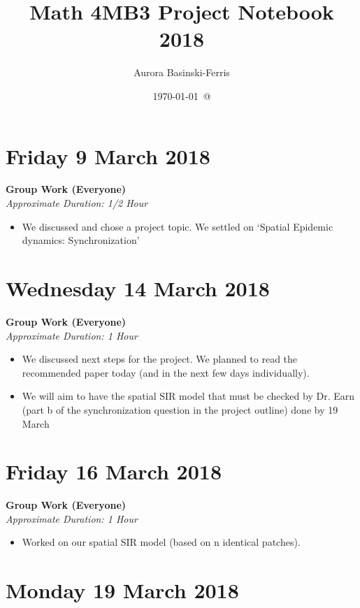 \documentclass[12pt]{article}\usepackage[]{graphicx}\usepackage[]{color}
\title{Math 4MB3 Project Notebook 2018}
\author{Aurora Basinski-Ferris}
\date{\today\ @ \thistime}
\begin{document}
\maketitle

\section*{Friday 9 March 2018}

\textbf{Group Work (Everyone)} \\
\emph{Approximate Duration: 1/2 Hour}

\begin{itemize}
\item We discussed and chose a project topic. We settled on `Spatial Epidemic dynamics: Synchronization'
\end{itemize}

\section*{Wednesday 14 March 2018}

\textbf{Group Work (Everyone)} \\
\emph{Approximate Duration: 1 Hour}

\begin{itemize}
\item We discussed next steps for the project. We planned to read the recommended paper today (and in the next few days individually). 
\item We will aim to have the spatial SIR model that must be checked by Dr. Earn (part b of the synchronization question in the project outline) done by 19 March
\end{itemize}

\section*{Friday 16 March 2018}

\textbf{Group Work (Everyone)} \\
\emph{Approximate Duration: 1 Hour}

\begin{itemize}
\item Worked on our spatial SIR model (based on n identical patches).
\end{itemize}

\section*{Monday 19 March 2018}
\end{document}
